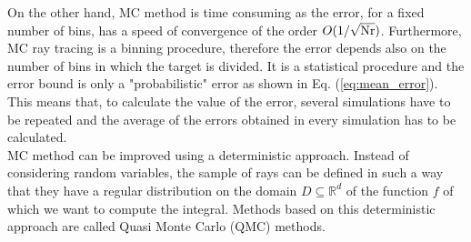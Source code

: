 On the other hand, MC method is time consuming as the error, for a fixed number of bins, has a speed of convergence of the order $O(1/\sqrt{\textrm{Nr}})$. Furthermore, MC ray tracing is a binning procedure, therefore the error depends also on the number of bins in which the target is divided. It is a statistical procedure and the error bound is only a "probabilistic" error as shown in Eq. (\ref{eq:mean_error}). This means that, to calculate the value of the error, several simulations have to be repeated and the average of the errors obtained in every simulation has to be calculated. \\ \indent MC method can be improved using a deterministic approach.
Instead of considering random variables, the sample of rays can be defined in such a way that they have a regular distribution on the domain $D\subseteq\mathbb{R}^d$ of the function $f$ of which we want to compute the integral. Methods based on this deterministic approach are called Quasi Monte Carlo (QMC) methods.
